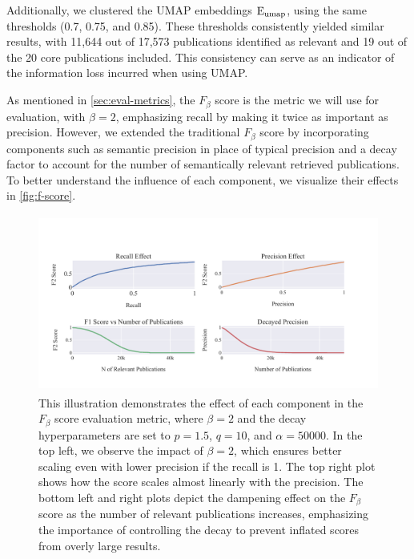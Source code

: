 Additionally, we clustered the UMAP embeddings $\mathop{}\!\mathrm{E_{umap}}$, using the same thresholds (0.7, 0.75, and 0.85). These thresholds consistently yielded similar results, with 11,644 out of 17,573 publications identified as relevant and 19 out of the 20 core publications included. This consistency can serve as an indicator of the information loss incurred when using UMAP.

As mentioned in \autoref{sec:eval-metrics}, the $F_{\beta}$ score is the metric we will use for evaluation, with $\beta=2$, emphasizing recall by making it twice as important as precision. However, we extended the traditional $F_{\beta}$ score by incorporating components such as semantic precision in place of typical precision and a decay factor to account for the number of semantically relevant retrieved publications. To better understand the influence of each component, we visualize their effects in \autoref{fig:f-score}.

\begin{figure}[!hb]
	\hspace*{-1cm}
	\includegraphics[width=450px, height=220px]{pics/f_score.pdf}
	\caption[$F_{\beta}$ Components Analysis]{This illustration demonstrates the effect of each component in the $F_{\beta}$ score evaluation metric, where $\beta=2$ and the decay hyperparameters are set to $p=1.5$, $q=10$, and $\alpha=50000$. In the top left, we observe the impact of $\beta=2$, which ensures better scaling even with lower precision if the recall is 1. The top right plot shows how the score scales almost linearly with the precision. The bottom left and right plots depict the dampening effect on the $F_{\beta}$ score as the number of relevant publications increases, emphasizing the importance of controlling the decay to prevent inflated scores from overly large results.}\label{fig:f-score}
\end{figure}


